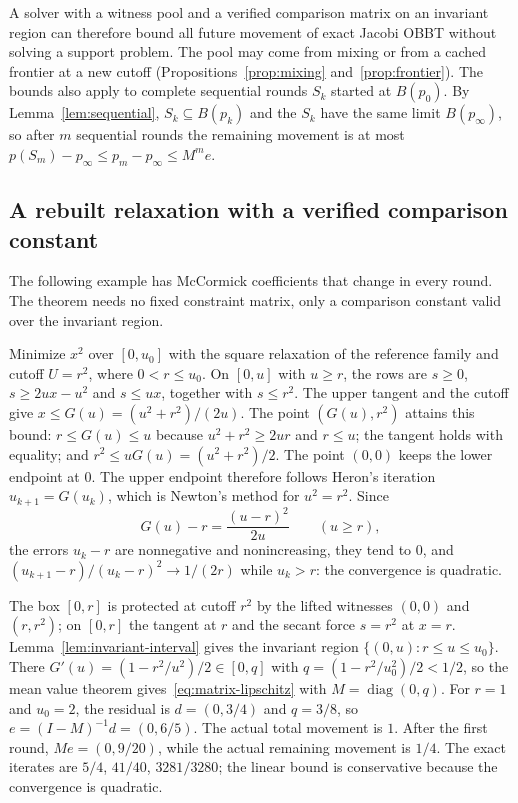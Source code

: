 A solver with a witness pool and a verified comparison matrix on an
invariant region can therefore bound all future movement of exact Jacobi
OBBT without solving a support problem. The pool may come from mixing or
from a cached frontier at a new cutoff
(Propositions~\ref{prop:mixing} and~\ref{prop:frontier}). The bounds also
apply to complete sequential rounds $S_k$ started at $B(p_0)$. By
Lemma~\ref{lem:sequential}, $S_k\subseteq B(p_k)$ and the $S_k$ have the
same limit $B(p_\infty)$, so after $m$ sequential rounds the remaining
movement is at most $p(S_m)-p_\infty\le p_m-p_\infty\le M^me$.

\subsection{A rebuilt relaxation with a verified comparison constant}\label{sec:residual-example}

The following example has McCormick coefficients that change in every
round. The theorem needs no fixed constraint matrix, only a comparison
constant valid over the invariant region.

\begin{example}\label{ex:heron}
Minimize $x^2$ over $[0,u_0]$ with the square relaxation of the
reference family and cutoff $U=r^2$, where $0<r\le u_0$. On $[0,u]$ with
$u\ge r$, the rows are $s\ge0$, $s\ge2ux-u^2$ and $s\le ux$, together
with $s\le r^2$. The upper tangent and the cutoff give
$x\le G(u)=(u^2+r^2)/(2u)$. The point $(G(u),r^2)$ attains this bound:
$r\le G(u)\le u$ because $u^2+r^2\ge2ur$ and $r\le u$; the tangent holds
with equality; and $r^2\le uG(u)=(u^2+r^2)/2$. The point $(0,0)$ keeps the
lower endpoint at $0$. The upper endpoint therefore follows Heron's
iteration $u_{k+1}=G(u_k)$, which is Newton's method for $u^2=r^2$. Since
\[
 G(u)-r=\frac{(u-r)^2}{2u}\qquad(u\ge r),
\]
the errors $u_k-r$ are nonnegative and nonincreasing, they tend to $0$,
and $(u_{k+1}-r)/(u_k-r)^2\to1/(2r)$ while $u_k>r$: the convergence is
quadratic.

The box $[0,r]$ is protected at cutoff $r^2$ by the lifted witnesses
$(0,0)$ and $(r,r^2)$; on $[0,r]$ the tangent at $r$ and the secant force
$s=r^2$ at $x=r$. Lemma~\ref{lem:invariant-interval} gives the invariant
region $\{(0,u):r\le u\le u_0\}$. There
$G'(u)=(1-r^2/u^2)/2\in[0,q]$ with $q=(1-r^2/u_0^2)/2<1/2$, so the mean
value theorem gives~\eqref{eq:matrix-lipschitz} with
$M=\operatorname{diag}(0,q)$. For $r=1$ and $u_0=2$, the residual is
$d=(0,3/4)$ and $q=3/8$, so $e=(I-M)^{-1}d=(0,6/5)$. The actual total
movement is $1$. After the first round, $Me=(0,9/20)$, while the actual
remaining movement is $1/4$. The exact iterates are $5/4$, $41/40$,
$3281/3280$; the linear bound is conservative because the convergence is
quadratic.
\end{example}

